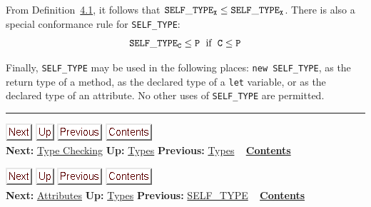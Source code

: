 \documentclass[]{article}
\begin{document}
From Definition~\href{node7.html\#def-conforms}{4.1}, it follows that
${\tt SELF\_TYPE}_{\tt X} \leq {\tt SELF\_TYPE}_{\tt X}$. There is also
a special conformance rule for \texttt{SELF\_TYPE}: \\

\begin{displaymath}\tt {\tt SELF\_TYPE}_C \leq P \;\mbox {\rm\ if\ }\; C \leq P \end{displaymath}

Finally, \texttt{SELF\_TYPE} may be used in the following places:
\texttt{new SELF\_TYPE}, as the return type of a method, as the declared
type of a \texttt{let} variable, or as the declared type of an
attribute. No other uses of \texttt{SELF\_TYPE} are permitted.

\begin{center}\rule{3in}{0.4pt}\end{center}

\href{node9.html}{\includegraphics{next.png}}
\href{node7.html}{\includegraphics{up.png}}
\href{node7.html}{\includegraphics{prev.png}}
\href{node1.html}{\includegraphics{contents.png}} \\ \textbf{Next:}
\href{node9.html}{Type Checking} \textbf{Up:} \href{node7.html}{Types}
\textbf{Previous:} \href{node7.html}{Types} ~
\textbf{\href{node1.html}{Contents}}

\href{node10.html}{\includegraphics{next.png}}
\href{node7.html}{\includegraphics{up.png}}
\href{node8.html}{\includegraphics{prev.png}}
\href{node1.html}{\includegraphics{contents.png}} \\ \textbf{Next:}
\href{node10.html}{Attributes} \textbf{Up:} \href{node7.html}{Types}
\textbf{Previous:} \href{node8.html}{SELF\_TYPE} ~
\textbf{\href{node1.html}{Contents}} \\ \\
\end{document}

